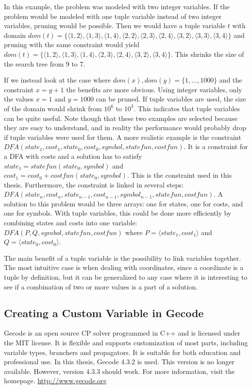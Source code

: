 \documentclass[a4paper,11pt]{article}
\begin{document}
In this example, the problem was modeled with two integer variables. If the problem would be modeled with one tuple variable instead of two integer variables, pruning would be possible. Then we would have a tuple variable $t$ with domain 
$dom(t)=\{
\langle1,2\rangle,\allowbreak 
\langle1,3\rangle,\allowbreak 
\langle1,4\rangle,\allowbreak
\langle2,2\rangle,\allowbreak
\langle2,3\rangle,\allowbreak
\langle2,4\rangle,\allowbreak
\langle3,2\rangle,\allowbreak
\langle3,3\rangle,\allowbreak
\langle3,4\rangle\}$ 
and pruning with the same constraint would yield 
$dom(t)=\{
\langle1,2\rangle,\allowbreak
\langle1,3\rangle,\allowbreak
\langle1,4\rangle,\allowbreak
\langle2,3\rangle,\allowbreak
\langle2,4\rangle,\allowbreak
\langle3,2\rangle,\allowbreak
\langle3,4\rangle\}$. 
This shrinks the size of the search tree from 9 to 7. 

If we instead look at the case where $dom(x),dom(y)=\{1,\ldots,1000\}$ and the constraint $x=y+1$ the benefits are more obvious. Using integer variables, only the values $x=1$ and $y=1000$ can be pruned. If tuple variables are used, the size of the domain would shrink from $10^6$ to $10^3$. This indicates that tuple variables can be quite useful. Note though that these two examples are selected because they are easy to understand, and in reality the performance would probably drop if tuple variables were used for them. A more realistic example is the constraint $DFA(state_1, cost_1, state_0, cost_0, symbol, statefun, costfun)$. It is a constraint for a DFA with costs and a solution has to satisfy $state_1= statefun(state_0, symbol)$ and $cost_1=cost_0+costfun(state_0, symbol)$. This is the constraint used in this thesis. Furthermore, the constraint is linked in several steps: $DFA(state_n, cost_n, state_{n-1}, cost_{n-1}, symbol_{n-1}, statefun, costfun)$. A solution to this problem would be three arrays: one for states, one for costs, and one for symbols. With tuple variables, this could be done more efficiently by combining states and costs into one variable: $DFA(P, Q, symbol, statefun, costfun)$ where $P=\langle state_1, cost_1\rangle$ and $Q=\langle state_0, cost_0\rangle$.

The main benefit of a tuple variable is the possibility to link variables together. The most intuitive case is when dealing with coordinates, since a coordinate is a tuple by definition, but it can be generalized to any case where it is interesting to see if a combination of two or more values is a part of a solution. 

\subsection{Creating a Custom Variable in Gecode}
Gecode is an open source CP solver programmed in C++ and is licensed under the MIT license. It is flexible and supports customization of most parts, including variable types, branchers and propagators. It is suitable for both education and professional use. In this thesis, Gecode 4.3.2 is used. This version is no longer available. However, version 4.3.3 should work. For more information, visit the homepage. \url{http://www.gecode.org}
\end{document}
